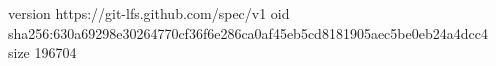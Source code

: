 version https://git-lfs.github.com/spec/v1
oid sha256:630a69298e30264770cf36f6e286ca0af45eb5cd8181905aec5be0eb24a4dcc4
size 196704
